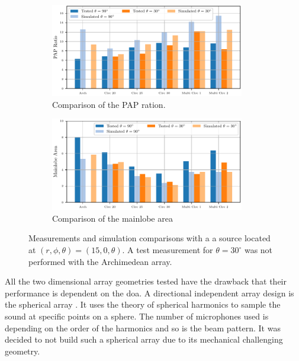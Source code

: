 \begin{figure}[ht]
	\centering
	\begin{subfigure}[b]{1\textwidth}
		\centering
		\includegraphics[width=0.93\textwidth]{images/5_array_evaluation/PapTestSim.pdf}
		\caption{Comparison of the PAP ration.}
		\label{fig:comp1}
	\end{subfigure}
	\begin{subfigure}[b]{1\textwidth}
		\centering
		\includegraphics[width=0.93\textwidth]{images/5_array_evaluation/AreaTestSim.pdf}
		\caption{Comparison of the mainlobe area}
		\label{fig:comp2}
	\end{subfigure}
	\caption{Measurements and simulation comparisons with a a source located at $(r, \phi, \theta) = (15, 0, \theta)$.
		A test measurement for $\theta = 30^\circ$ was not performed with the Archimedean array.}
	\label{fig:TestSim}
\end{figure}

All the two dimensional array geometries tested have the drawback
that their performance is dependent on the \acrshort{doa}.
A directional independent array design is the spherical array \cite{Rafaely2010}.
It uses the theory of spherical harmonics to sample the sound at specific points
on a sphere.
The number of microphones used is depending on the order of the harmonics and so
is the beam pattern.
It was decided to not build such a spherical array due to its mechanical
challenging geometry.

